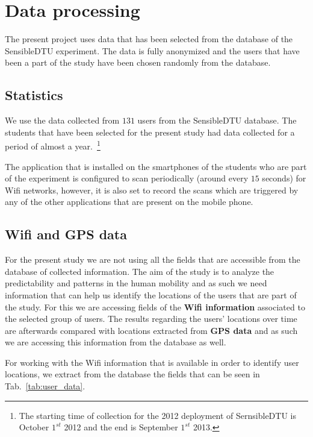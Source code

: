\chapter{Data processing}
The present project uses data that has been selected from the database of the
SensibleDTU experiment. The data is fully anonymized and the users that have
been a part of the study have been chosen randomly from the database.

\section{Statistics}
We use the data collected from $131$ users from the SensibleDTU database. The
students that have been selected for the present study had data collected for a
period of almost a year.~\footnote{The starting time of collection for the 2012
deployment of SernsibleDTU is October $1^{st}$ 2012 and the end is September
$1^{st}$ 2013.}

The application that is installed on the smartphones of the students who are
part of the experiment is configured to scan periodically (around every $15$
seconds) for Wifi networks, however, it is also set to record the scans which
are triggered by any of the other applications that are present on the mobile
phone.

\section{Wifi and GPS data}
\label{data_structures}
For the present study we are not using all the fields that are accessible from
the database of collected information. The aim of the study is to analyze the
predictability and patterns in the human mobility and as such we need
information that can help us identify the locations of the users that are part
of the study. For this we are accessing fields of the \textbf{Wifi information}
associated to the selected group of users. The results regarding the users'
locations over time are afterwards compared with locations extracted from
\textbf{GPS data} and as such we are accessing this information from the
database as well.

For working with the Wifi information that is available in order to identify
user locations, we extract from the database the fields that can be seen in
Tab.~\ref{tab:user_data}.

